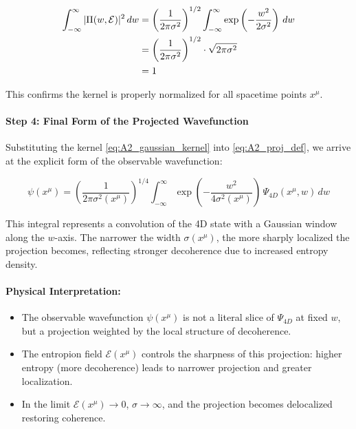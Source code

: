 \documentclass[12pt]{article}
\begin{document}
\begin{align}
\int_{-\infty}^{\infty} |\Pi(w, \mathcal{E})|^2\, dw 
&= \left( \frac{1}{2\pi \sigma^2} \right)^{1/2} \int_{-\infty}^{\infty} \exp\left( -\frac{w^2}{2\sigma^2} \right)\, dw \notag \\
&= \left( \frac{1}{2\pi \sigma^2} \right)^{1/2} \cdot \sqrt{2\pi \sigma^2} \notag \\
&= 1
\label{eq:A2_kernel_verification}
\end{align}

This confirms the kernel is properly normalized for all spacetime points \(x^\mu\).

\vspace{1em}
\noindent
\paragraph{Step 4: Final Form of the Projected Wavefunction}

Substituting the kernel \eqref{eq:A2_gaussian_kernel} into \eqref{eq:A2_proj_def}, we arrive at the explicit form of the observable wavefunction:

\begin{equation}
\psi(x^\mu) = \left( \frac{1}{2\pi \sigma^2(x^\mu)} \right)^{1/4} \int_{-\infty}^{\infty} \exp\left( -\frac{w^2}{4\sigma^2(x^\mu)} \right)\, \Psi_{4D}(x^\mu, w)\, dw
\label{eq:A2_final_form}
\end{equation}

This integral represents a convolution of the 4D state with a Gaussian window along the \(w\)-axis. The narrower the width \(\sigma(x^\mu)\), the more sharply localized the projection becomes, reflecting stronger decoherence due to increased entropy density.

\vspace{1em}
\noindent
\paragraph{Physical Interpretation:}

\begin{itemize}
    \item The observable wavefunction \(\psi(x^\mu)\) is not a literal slice of \(\Psi_{4D}\) at fixed \(w\), but a projection weighted by the local structure of decoherence.
    \item The entropion field \(\mathcal{E}(x^\mu)\) controls the sharpness of this projection: higher entropy (more decoherence) leads to narrower projection and greater localization.
    \item In the limit \(\mathcal{E}(x^\mu) \rightarrow 0\), \(\sigma \rightarrow \infty\), and the projection becomes delocalized restoring coherence.
\end{itemize}
\end{document}
